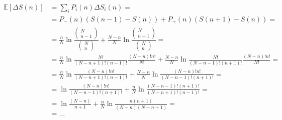 \documentclass[letterpaper,10pt,english]{jupyterBook}
\begin{document}
\begin{equation*}
\begin{split}\begin{aligned}
  \mathbb{E}\left[ \Delta S(n) \right] 
  & = \sum_{i} P_i(n) \Delta S_i(n) = \\
  & = P_{-}(n) \left( S(n-1) - S(n) \right) + P_{+}(n) \left( S(n+1) - S(n) \right) = \\
  & = \frac{n}{N} \ln \frac{\left( \begin{matrix} N \\ n-1 \end{matrix} \right) }{\left( \begin{matrix} N \\ n \end{matrix} \right) } + \frac{N-n}{N} \ln \frac{\left( \begin{matrix} N \\ n+1 \end{matrix} \right) }{\left( \begin{matrix} N \\ n \end{matrix} \right) } = \\
  & = \frac{n}{N} \ln \frac{N!}{(N-n+1)!(n-1)!} \frac{(N-n)!n!}{N!} + \frac{N-n}{N} \ln \frac{N!}{(N-n-1)!(n+1)!} \frac{(N-n)!n!}{N!} = \\
  & = \frac{n}{N} \ln \frac{(N-n)!n!}{(N-n+1)!(n-1)!} + \frac{N-n}{N} \ln \frac{(N-n)! n!}{(N-n-1)!(n+1)!} = \\
  & = \ln \frac{(N-n)! n!}{(N-n-1)!(n+1)!} + \frac{n}{N} \ln \frac{(N-n-1)!(n+1)!}{(N-n+1)!(n-1)!} = \\
  & = \ln \frac{(N-n)}{n+1} + \frac{n}{N} \ln \frac{n (n+1)}{(N-n)(N-n+1)} = \\
  & = \dots
\end{aligned}\end{split}
\end{equation*}
\sphinxAtStartPar
{} 
\end{document}

